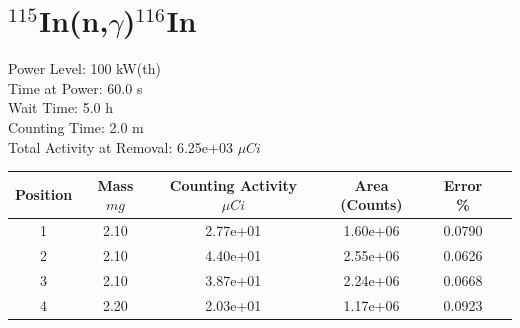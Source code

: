 \newpage

\section*{ $^{115}$In(n,$\gamma$)$^{116}$In }

Power Level: 100 kW(th) \\
Time at Power: 60.0 s \\
Wait Time:  5.0 h \\
Counting Time:  2.0 m \\
Total Activity at Removal: 6.25e+03 $\mu Ci$

\begin{table}[h]
\centering
\begin{tabular}{ |c|c|c|c|c|c| }
 \hline
 Position & Mass $mg$ & Counting Activity $\mu Ci$ & Area (Counts) & Error \% \\
 \hline 
 1 & 2.10 & 2.77e+01 & 1.60e+06 & 0.0790 \\ 
\hline
 2 & 2.10 & 4.40e+01 & 2.55e+06 & 0.0626 \\ 
\hline
 3 & 2.10 & 3.87e+01 & 2.24e+06 & 0.0668 \\ 
\hline
 4 & 2.20 & 2.03e+01 & 1.17e+06 & 0.0923 \\ 
\hline
\end{tabular}
\end{table}

